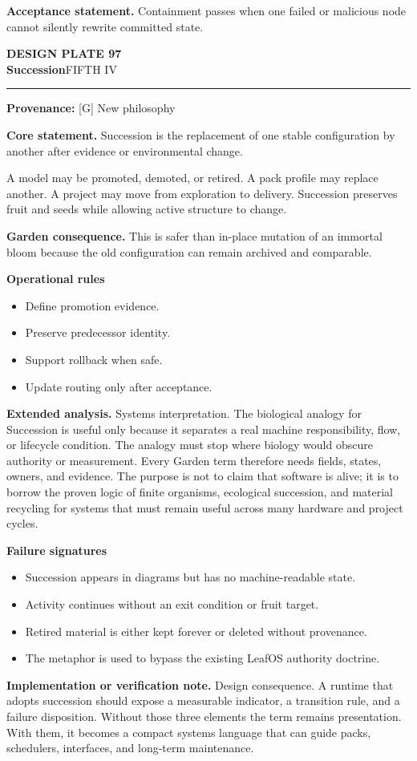 \documentclass[10pt,letterpaper,oneside]{article}
\newcommand{\prov}[1]{\textcolor{gardenBlue}{\sffamily\footnotesize\textbf{Provenance:} #1}}
\newcommand{\platetitle}[3]{%
  \begin{minipage}[t][0.54in][t]{\textwidth}
  {\sffamily\bfseries\color{gardenDeep}\fontsize{9}{10}\selectfont DESIGN PLATE #1}\\[-1pt]
  {\sffamily\bfseries\color{gardenInk}\fontsize{16.5}{18}\selectfont #2}\hfill{\sffamily\color{gardenGreen}\large #3}
  \end{minipage}\vspace{-2pt}\hrule\vspace{5pt}}
\begin{document}
\begin{acceptbox}
\textbf{Acceptance statement.} Containment passes when one failed or malicious node cannot silently rewrite committed state.
\end{acceptbox}
\newpage
\platetitle{97}{Succession}{FIFTH IV}
\prov{[G] New philosophy}
\fontsize{8.85}{10.45}\selectfont
\begin{corebox}
\textbf{Core statement.} Succession is the replacement of one stable configuration by another after evidence or environmental change.
\end{corebox}
A model may be promoted, demoted, or retired. A pack profile may replace another. A project may move from exploration to delivery. Succession preserves fruit and seeds while allowing active structure to change.

\textbf{Garden consequence.} This is safer than in-place mutation of an immortal bloom because the old configuration can remain archived and comparable.

\textbf{Operational rules}
\begin{itemize}
\item Define promotion evidence.
\item Preserve predecessor identity.
\item Support rollback when safe.
\item Update routing only after acceptance.
\end{itemize}
\textbf{Extended analysis.} Systems interpretation. The biological analogy for Succession is useful only because it separates a real machine responsibility, flow, or lifecycle condition. The analogy must stop where biology would obscure authority or measurement. Every Garden term therefore needs fields, states, owners, and evidence. The purpose is not to claim that software is alive; it is to borrow the proven logic of finite organisms, ecological succession, and material recycling for systems that must remain useful across many hardware and project cycles.

\textbf{Failure signatures}
\begin{itemize}
\item Succession appears in diagrams but has no machine-readable state.
\item Activity continues without an exit condition or fruit target.
\item Retired material is either kept forever or deleted without provenance.
\item The metaphor is used to bypass the existing LeafOS authority doctrine.
\end{itemize}
\textbf{Implementation or verification note.} Design consequence. A runtime that adopts succession should expose a measurable indicator, a transition rule, and a failure disposition. Without those three elements the term remains presentation. With them, it becomes a compact systems language that can guide packs, schedulers, interfaces, and long-term maintenance.
\end{document}
